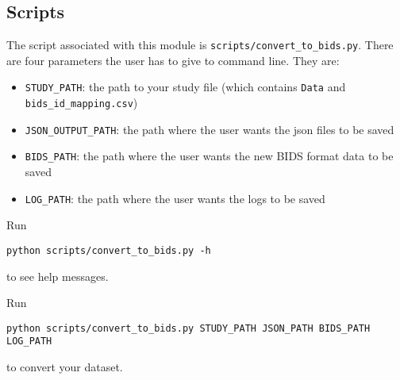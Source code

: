 \documentclass[12pt]{myland}
\def\<#1>{\texttt{#1}}
\begin{document}
    \subsection{Scripts}
    The script associated with this module is \<scripts/convert\_to\_bids.py>. There are four 
    parameters the user has to give to command line. They are:
    \begin{itemize}
        \item \<STUDY\_PATH>: the path to your study file (which contains \<Data> and \<bids\_id\_mapping.csv>)
        \item \<JSON\_OUTPUT\_PATH>: the path where the user wants the json files to be saved
        \item \<BIDS\_PATH>: the path where the user wants the new BIDS format data to be saved
        \item \<LOG\_PATH>: the path where the user wants the logs to be saved
    \end{itemize}

    Run
    \begin{lstlisting}[xleftmargin=.22\textwidth, xrightmargin=.22\textwidth, backgroundcolor=\color{lightgray}]
    python scripts/convert_to_bids.py -h
    \end{lstlisting}        
    to see help messages. \par

    Run
    \begin{lstlisting}[backgroundcolor=\color{lightgray}]
    python scripts/convert_to_bids.py STUDY_PATH JSON_PATH BIDS_PATH LOG_PATH
    \end{lstlisting}        
    to convert your dataset. \par

\end{document}

